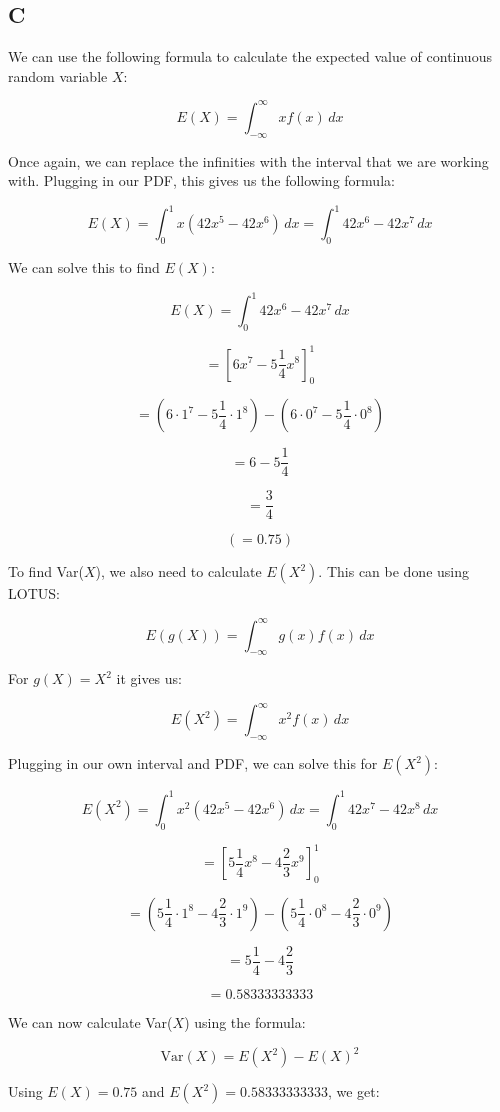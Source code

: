 \documentclass[12pt]{article}
\begin{document}
\subsection*{C}
We can use the following formula to calculate the expected value of continuous random variable $X$:

\[ E(X) = \int_{-\infty}^{\infty} xf(x) \,dx \]

\noindent
Once again, we can replace the infinities with the interval that we are working with.
Plugging in our PDF, this gives us the following formula:

\[ E(X) = \int_{0}^{1} x(42x^5 - 42x^6) \,dx = \int_{0}^{1} 42x^6 - 42x^7 \,dx \]

\noindent
We can solve this to find $E(X)$:

\[ E(X) = \int_{0}^{1} 42x^6 - 42x^7 \,dx \]

\[ = \left[ 6x^7 - 5\frac{1}{4}x^8 \right]_{0}^{1}  \]

\[ = (6 \cdot 1^7 - 5\frac{1}{4} \cdot 1^8) - (6 \cdot 0^7 - 5\frac{1}{4} \cdot 0^8) \]

\[ = 6 - 5\frac{1}{4} \]

\[ = \frac{3}{4} \]

\[ (= 0.75) \]

\noindent
To find Var($X$), we also need to calculate $E(X^2)$.
This can be done using LOTUS:

\[ E(g(X)) = \int_{-\infty}^{\infty} g(x)f(x) \,dx \]

\noindent
For $g(X) = X^2$ it gives us:

\[ E(X^2) = \int_{-\infty}^{\infty} x^2f(x) \,dx \]

\noindent
Plugging in our own interval and PDF, we can solve this for $E(X^2)$:

\[ E(X^2) = \int_{0}^{1} x^2(42x^5 - 42x^6) \,dx = \int_{0}^{1} 42x^7 - 42x^8 \,dx \]

\[ = \left[ 5\frac{1}{4}x^8 - 4\frac{2}{3}x^9 \right]_{0}^{1} \]

\[ = (5\frac{1}{4} \cdot 1^8 - 4\frac{2}{3} \cdot 1^9) - (5\frac{1}{4} \cdot 0^8 - 4\frac{2}{3} \cdot 0^9) \]

\[ = 5\frac{1}{4} - 4\frac{2}{3} \]

\[ = 0.58333333333 \]

\newpage
\noindent
We can now calculate Var($X$) using the formula:

\[ \text{Var}(X) = E(X^2) - E(X)^2 \]

\noindent
Using $E(X) = 0.75$ and $E(X^2) = 0.58333333333$, we get:
\end{document}
